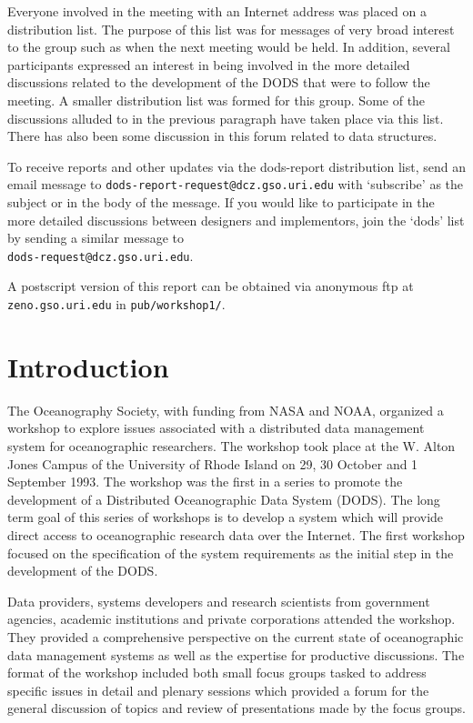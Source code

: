 Everyone involved in the meeting with an Internet address was placed on a
distribution list. The purpose of this list was for messages of very broad
interest to the group such as when the next meeting would be held.  In
addition, several participants expressed an interest in being involved in the
more detailed discussions related to the development of the DODS that were to
follow the meeting. A smaller distribution list was formed for this
group. Some of the discussions alluded to in the previous paragraph have
taken place via this list. There has also been some discussion in this forum
related to data structures. 

To receive reports and other updates via the dods-report distribution list,
send an email message to {\tt dods-report-request@dcz.gso.uri.edu} with
`subscribe' as the subject or in the body of the message. If you would like
to participate in the more detailed discussions between designers and
implementors, join the `dods' list by sending a similar message to\\
{\tt dods-request@dcz.gso.uri.edu}.

A postscript version of this report can be obtained via anonymous ftp at\\
{\tt zeno.gso.uri.edu} in {\tt pub/workshop1/}.
\newpage

\tableofcontents
\listoffigures

\newpage

\section{\bf Introduction}

The Oceanography Society, with funding from NASA and NOAA, organized a
workshop to explore issues associated with a distributed data management
system for oceanographic researchers.  The workshop took place at the
W. Alton Jones Campus of the University of Rhode Island on 29, 30 October and
1 September 1993. The workshop was the first in a series to promote the
development of a Distributed Oceanographic Data System (DODS). The long term
goal of this series of workshops is to develop a system which will provide
direct access to oceanographic research data over the Internet. The first
workshop focused on the specification of the system requirements as the
initial step in the development of the DODS.

Data providers, systems developers and research scientists from government
agencies, academic institutions and private corporations attended the
workshop. They provided a comprehensive perspective on the current state of
oceanographic data management systems as well as the expertise for productive
discussions. The format of the workshop included both small focus groups
tasked to address specific issues in detail and plenary sessions which
provided a forum for the general discussion of topics and review of
presentations made by the focus groups.

